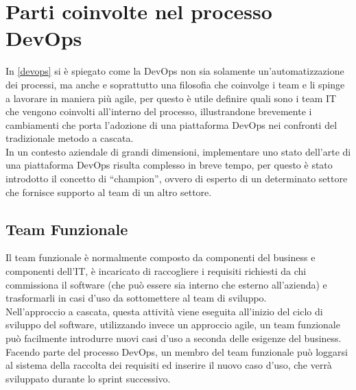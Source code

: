 \documentclass[a4paper, 12pt]{report}
\numberwithin{equation}{section}
\begin{document}
\chapter{Parti coinvolte nel processo DevOps}\label{teams}
In \ref{devops} si è spiegato come la DevOps non sia solamente un’automatizzazione dei processi, ma  anche e soprattutto una filosofia che coinvolge i team e li spinge a lavorare in maniera più agile, per questo è utile definire quali sono i team IT che vengono coinvolti all’interno del processo, illustrandone brevemente i cambiamenti che porta l’adozione di una piattaforma DevOps nei confronti del tradizionale metodo a cascata.\\
In un contesto aziendale di grandi dimensioni, implementare uno stato dell’arte di una piattaforma DevOps risulta complesso in breve tempo, per questo è stato introdotto il concetto di “champion”, ovvero di esperto di un determinato settore che fornisce supporto al team di un altro settore.

\section{Team Funzionale}
Il team funzionale è normalmente composto da componenti del business e componenti dell’IT, è incaricato di raccogliere i requisiti richiesti da chi commissiona il software (che può essere sia interno che esterno all’azienda) e trasformarli in casi d’uso da sottomettere al team di sviluppo.\\
Nell’approccio a cascata, questa attività viene eseguita all’inizio del ciclo di sviluppo del software, utilizzando invece un approccio agile, un team funzionale può facilmente introdurre nuovi casi d’uso a seconda delle esigenze del business. Facendo parte del processo DevOps, un membro del team funzionale può loggarsi al sistema della raccolta dei requisiti ed inserire il nuovo caso d’uso, che verrà sviluppato durante lo sprint successivo.
\end{document}
